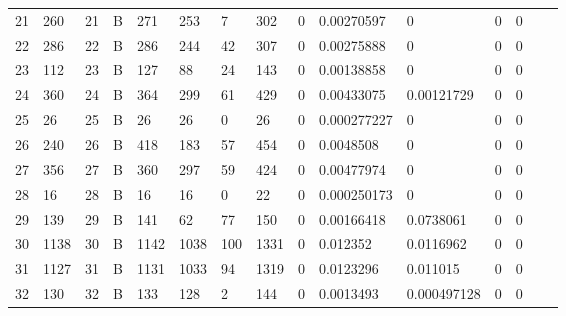 \begin{longtable}{lllllllllllllll}
	21  & 260               & 21  & B   & 271               & 253               & 7                 & 302  & 0          & 0.00270597     & 0              & 0             & 0            \\
	22  & 286               & 22  & B   & 286               & 244               & 42                & 307  & 0          & 0.00275888     & 0              & 0             & 0            \\
	23  & 112               & 23  & B   & 127               & 88                & 24                & 143  & 0          & 0.00138858     & 0              & 0             & 0            \\
	24  & 360               & 24  & B   & 364               & 299               & 61                & 429  & 0          & 0.00433075     & 0.00121729     & 0             & 0            \\
	25  & 26                & 25  & B   & 26                & 26                & 0                 & 26   & 0          & 0.000277227    & 0              & 0             & 0            \\
	26  & 240               & 26  & B   & 418               & 183               & 57                & 454  & 0          & 0.0048508      & 0              & 0             & 0            \\
	27  & 356               & 27  & B   & 360               & 297               & 59                & 424  & 0          & 0.00477974     & 0              & 0             & 0            \\
	28  & 16                & 28  & B   & 16                & 16                & 0                 & 22   & 0          & 0.000250173    & 0              & 0             & 0            \\
	29  & 139               & 29  & B   & 141               & 62                & 77                & 150  & 0          & 0.00166418     & 0.0738061      & 0             & 0            \\
	30  & 1138              & 30  & B   & 1142              & 1038              & 100               & 1331 & 0          & 0.012352       & 0.0116962      & 0             & 0            \\
	31  & 1127              & 31  & B   & 1131              & 1033              & 94                & 1319 & 0          & 0.0123296      & 0.011015       & 0             & 0            \\
	32  & 130               & 32  & B   & 133               & 128               & 2                 & 144  & 0          & 0.0013493      & 0.000497128    & 0             & 0            \\

\end{longtable}
